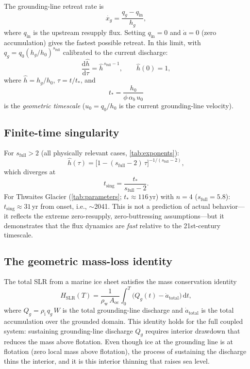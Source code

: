 \documentclass[11pt]{article}
\newcommand{\dd}{\mathrm{d}}
\newcommand{\Qg}{Q_g}
\newcommand{\qg}{q_g}
\newcommand{\hg}{h_g}
\newcommand{\hhat}{\hat{h}}
\newcommand{\xg}{x_g}
\newcommand{\rhoi}{\rho_{\mathrm{i}}}
\newcommand{\rhow}{\rho_{\mathrm{w}}}
\newcommand{\Aoc}{A_{\mathrm{oc}}}
\begin{document}
The grounding-line retreat rate is \citep{Schoof2012}
\begin{equation}
	\dot{\xg} = \frac{\qg - q_{\mathrm{in}}}{\hg},
	\label{eq:retreat_rate}
\end{equation}
where $q_{\mathrm{in}}$ is the upstream resupply flux. Setting $q_{\mathrm{in}} = 0$ and $\dot{a} = 0$ (zero accumulation) gives the fastest possible retreat. In this limit, with $\qg = q_0(\hg/h_0)^{s_{\mathrm{full}}}$ calibrated to the current discharge:
\begin{equation}
	\frac{\dd\hhat}{\dd\tau} = \hhat^{\,s_{\mathrm{full}}-1},
	\qquad \hhat(0) = 1,
	\label{eq:hhat_ode}
\end{equation}
where $\hhat = \hg/h_0$, $\tau = t/t_*$, and
\begin{equation}
	t_* = \frac{h_0}{\phi\,\alpha_b\,u_0}
	\label{eq:tstar}
\end{equation}
is the \emph{geometric timescale} ($u_0 = q_0/h_0$ is the current grounding-line velocity).

\subsection{Finite-time singularity}

For $s_{\mathrm{full}} > 2$ (all physically relevant cases, \cref{tab:exponents}):
\begin{equation}
	\hhat(\tau) = \bigl[1 - (s_{\mathrm{full}}-2)\,\tau\bigr]^{-1/(s_{\mathrm{full}}-2)},
	\label{eq:hhat_solution}
\end{equation}
which diverges at
\begin{equation}
	t_{\mathrm{sing}} = \frac{t_*}{s_{\mathrm{full}} - 2}.
	\label{eq:t_sing}
\end{equation}
For Thwaites Glacier (\cref{tab:parameters}; $t_* \approx 116$\,yr) with $n = 4$ ($s_{\mathrm{full}} = 5.8$): $t_{\mathrm{sing}} \approx 31$\,yr from onset, i.e., $\sim$2041. This is not a prediction of actual behavior---it reflects the extreme zero-resupply, zero-buttressing assumptions---but it demonstrates that the flux dynamics are \emph{fast} relative to the 21st-century timescale.

\subsection{The geometric mass-loss identity}

The total SLR from a marine ice sheet satisfies the mass conservation identity
\begin{equation}
	H_{\mathrm{SLR}}(T) = \frac{1}{\rhow\,\Aoc}\int_0^T\!\bigl(\Qg(t) - \dot{a}_{\mathrm{total}}\bigr)\,\dd t,
	\label{eq:slr_identity}
\end{equation}
where $\Qg = \rhoi\,\qg\,W$ is the total grounding-line discharge and $\dot{a}_{\mathrm{total}}$ is the total accumulation over the grounded domain. This identity holds for the full coupled system: sustaining grounding-line discharge $\Qg$ requires interior drawdown that reduces the mass above flotation. Even though ice at the grounding line is at flotation (zero local mass above flotation), the process of sustaining the discharge thins the interior, and it is this interior thinning that raises sea level.
\end{document}
